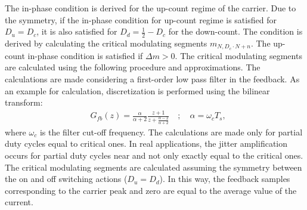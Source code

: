 \documentclass[journal]{IEEEtran}
\begin{document}
The in-phase condition is derived for the up-count regime of the carrier. Due to the symmetry, if the in-phase condition for up-count regime is satisfied for $D_u = D_c$, it is also satisfied for $D_d = \frac{1}{2}-D_c$ for the down-count. The condition is derived by calculating the critical modulating segments $m_{N , D_c \cdot N + n}$. The up-count in-phase condition is satisfied if $\Delta m > 0$. The critical modulating segments are calculated using the following procedure and approximations. The calculations are made considering a first-order low pass filter in the feedback. As an example for calculation, discretization is performed using the bilinear transform:
\begin{equation}
\begin{aligned}
& G_{fb}(z) = \frac{\alpha}{\alpha + 2} \frac{z + 1}{z + \frac{\alpha - 2}{\alpha + 2}} \quad ; \quad \alpha = \omega_c T_s,  \label{eq:lpf} 
\end{aligned} 
\end{equation}
where $\omega_c$ is the filter cut-off frequency. The calculations are made only for partial duty cycles equal to critical ones. In real applications, the jitter amplification occurs for partial duty cycles near and not only exactly equal to the critical ones. The critical modulating segments are calculated assuming the symmetry between the on and off switching actions ($D_u = D_d$). In this way, the feedback samples corresponding to the carrier peak and zero are equal to the average value of the current. 
\end{document}
